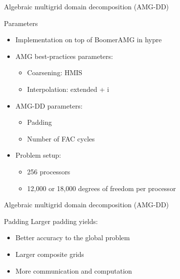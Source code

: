 \documentclass[18pt,xcolor=table]{beamer}
\begin{document}
\begin{frame}{Algebraic multigrid domain decomposition (AMG-DD)}
\begin{block}{Parameters}
\begin{itemize}
\item Implementation on top of BoomerAMG in hypre
\item AMG best-practices parameters:
\begin{itemize}
   \item Coarsening: HMIS
   \item Interpolation: extended + i
\end{itemize}
\item AMG-DD parameters:
\begin{itemize}
   \item Padding
   \item Number of FAC cycles
\end{itemize}
\item Problem setup:
\begin{itemize}
   \item 256 processors
   \item 12,000 or 18,000 degrees of freedom per processor
\end{itemize}
\end{itemize}
\end{block}

\end{frame}

\begin{frame}{Algebraic multigrid domain decomposition (AMG-DD)}
\begin{block}{Padding}
Larger padding yields:
\begin{itemize}
   \item Better accuracy to the global problem
   \item Larger composite grids
   \item More communication and computation
\end{itemize}
\end{block}

\centering
\vspace{0.5 cm}

\end{frame}
\end{document}
